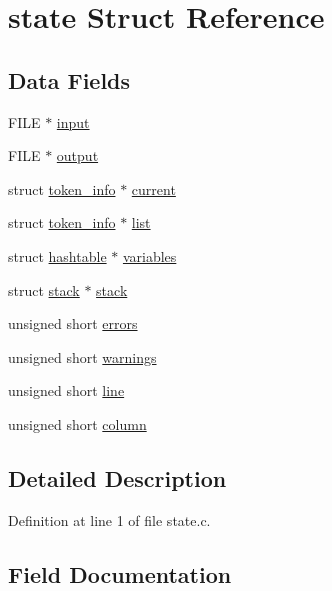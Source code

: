 \hypertarget{structstate}{}\section{state Struct Reference}
\label{structstate}
\subsection*{Data Fields}
\begin{DoxyCompactItemize}
\item 
F\+I\+LE $\ast$ \mbox{\hyperlink{structstate_abfae665d56d61e1c21831bec369abd34}{input}}
\item 
F\+I\+LE $\ast$ \mbox{\hyperlink{structstate_ab41bf19330e50c3c7bf3544c53f30971}{output}}
\item 
struct \mbox{\hyperlink{structtoken__info}{token\+\_\+info}} $\ast$ \mbox{\hyperlink{structstate_a825c85b4ca3062c1b9eddfb7c7db51e8}{current}}
\item 
struct \mbox{\hyperlink{structtoken__info}{token\+\_\+info}} $\ast$ \mbox{\hyperlink{structstate_ae1283cface726b16d3b16bbbf0a702ee}{list}}
\item 
struct \mbox{\hyperlink{structhashtable}{hashtable}} $\ast$ \mbox{\hyperlink{structstate_a7e36c2490492a4c09cbe8a6ef51c5a95}{variables}}
\item 
struct \mbox{\hyperlink{structstack}{stack}} $\ast$ \mbox{\hyperlink{structstate_a3fdd23f2fd4b006bb7e38f0b39956c44}{stack}}
\item 
unsigned short \mbox{\hyperlink{structstate_a2ff1e8f5aaf49121a59c84adb687936c}{errors}}
\item 
unsigned short \mbox{\hyperlink{structstate_a8f15148e128309c287fada7b1fa5090c}{warnings}}
\item 
unsigned short \mbox{\hyperlink{structstate_a12da61ba70beb7fda26fb3c1703b7b12}{line}}
\item 
unsigned short \mbox{\hyperlink{structstate_aa711ac8c1fc3d2cc6a64e13bda8993f4}{column}}
\end{DoxyCompactItemize}


\subsection{Detailed Description}


Definition at line 1 of file state.\+c.



\subsection{Field Documentation}
\mbox{\label{structstate_aa711ac8c1fc3d2cc6a64e13bda8993f4}} 
